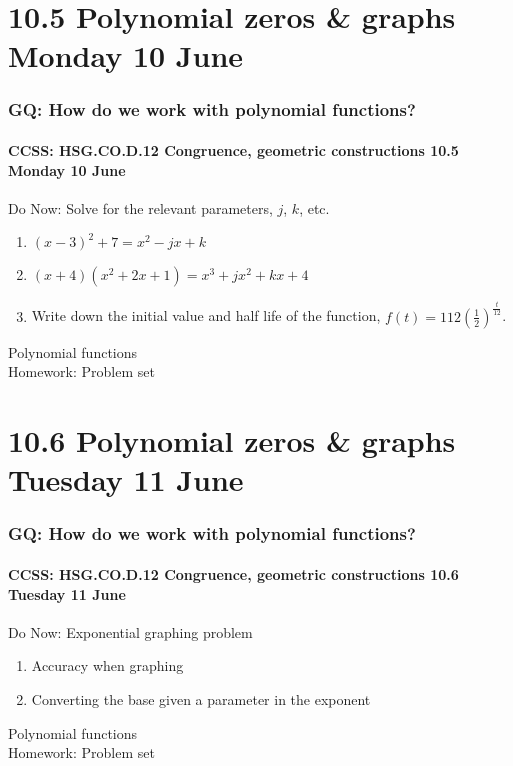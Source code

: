 \documentclass{beamer}
\begin{document}
\section{10.5 Polynomial zeros \& graphs Monday 10 June}
  \frame
  {
    \frametitle{GQ: How do we work with polynomial functions?}
    \framesubtitle{CCSS: HSG.CO.D.12 Congruence, geometric constructions \hfill \alert{10.5 Monday 10 June}}

    \begin{block}{Do Now: Solve for the relevant parameters, $j$, $k$, etc.}
      \begin{enumerate}
        \item $(x-3)^2+7=x^2-jx+k$
        \item $(x+4)(x^2+2x+1)=x^3+jx^2+kx+4$
        \item Write down the initial value and half life of the function, $\displaystyle f(t)=112 \left( \frac{1}{2} \right)^{\frac{t}{12}}$.
      \end{enumerate}
    \end{block}
    Polynomial functions\\[0.25cm]
    Homework: Problem set
  }

\section{10.6 Polynomial zeros \& graphs Tuesday 11 June}
  \frame
  {
    \frametitle{GQ: How do we work with polynomial functions?}
    \framesubtitle{CCSS: HSG.CO.D.12 Congruence, geometric constructions \hfill \alert{10.6 Tuesday 11 June}}

    \begin{block}{Do Now: Exponential graphing problem}
      \begin{enumerate}
        \item Accuracy when graphing
        \item Converting the base given a parameter in the exponent
      \end{enumerate}
    \end{block}
    Polynomial functions\\[0.25cm]
    Homework: Problem set
  }
\end{document}
